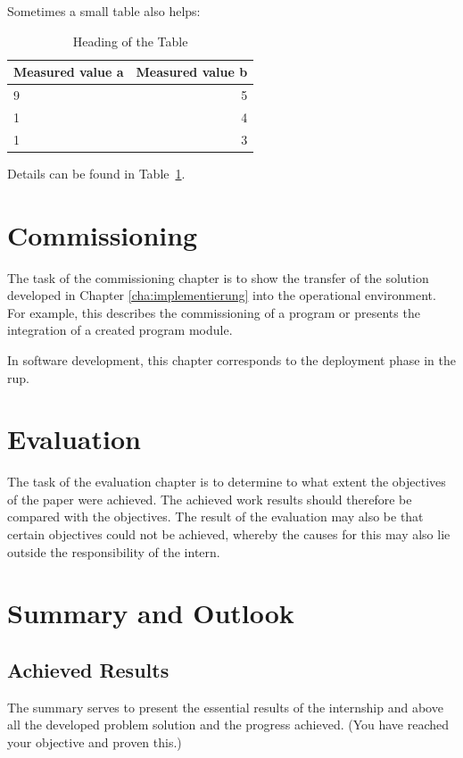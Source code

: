 \documentclass[oneside]{ausarbeitung}
\begin{document}
Sometimes a small table also helps:

\begin{table}[htbp]
\centering
\begin{tabular}{|l|r|}
\hline
\textbf{Measured value a} & \textbf{Measured value b} \\ \hline
9 & 5 \\ \hline
1 & 4 \\ \hline
1 & 3 \\ \hline
\end{tabular}
\caption{Heading of the Table}
\label{tab:my-table}
\end{table}

Details can be found in Table~\ref{tab:my-table}.
\chapter{Commissioning}
\label{cha:inbetriebnahme}

The task of the commissioning chapter is to show the transfer of the solution
developed in Chapter \ref{cha:implementierung} into the operational environment.
For example, this describes the commissioning of a program
or presents the integration of a created program module.

In software development, this chapter corresponds to the
deployment phase in the \ac{rup}.

\chapter{Evaluation}

The task of the evaluation chapter is to determine to what extent the objectives of the
paper were achieved. The achieved work results should therefore be compared
with the objectives. The result of the evaluation may also be
that certain objectives could not be achieved, whereby the
causes for this may also lie outside the responsibility of the
intern.

\chapter{Summary and Outlook}
\label{cha:zusammenfassung}

\section{Achieved Results}
\label{sec:ergebnisse}

The summary serves to present the essential results of the
internship and above all the developed problem solution and the
progress achieved. (You have reached your objective and
proven this.)
\end{document}
